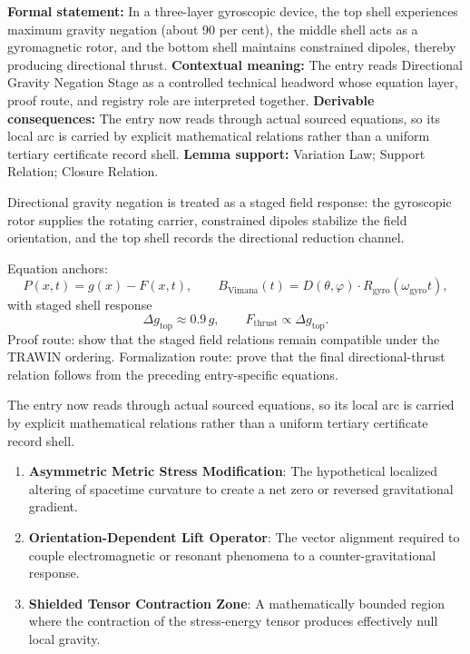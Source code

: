 \begingroup\footnotesize\setlength{\emergencystretch}{3em}\sloppy
\textbf{Formal statement:} In a three-layer gyroscopic device, the top shell experiences maximum gravity negation (about 90 per cent), the middle shell acts as a gyromagnetic rotor, and the bottom shell maintains constrained dipoles, thereby producing directional thrust. \textbf{Contextual meaning:} The entry reads Directional Gravity Negation Stage as a controlled technical headword whose equation layer, proof route, and registry role are interpreted together. \textbf{Derivable consequences:} The entry now reads through actual sourced equations, so its local arc is carried by explicit mathematical relations rather than a uniform tertiary certificate record shell. \textbf{Lemma support:} Variation Law; Support Relation; Closure Relation.\par
\endgroup

Directional gravity negation is treated as a staged field response: the gyroscopic rotor supplies the rotating carrier, constrained dipoles stabilize the field orientation, and the top shell records the directional reduction channel.

Equation anchors:
\[
P(x,t)=g(x)-F(x,t),
\qquad
B_{\mathrm{Vimana}}(t)=D(\theta,\varphi)\cdot R_{\mathrm{gyro}}(\omega_{\mathrm{gyro}}t),
\]
with staged shell response
\[
\Delta g_{\mathrm{top}}\approx0.9\,g,\qquad
F_{\mathrm{thrust}}\propto \Delta g_{\mathrm{top}}.
\]
Proof route: show that the staged field relations remain compatible under the TRAWIN ordering. Formalization route: prove that the final directional-thrust relation follows from the preceding entry-specific equations.

The entry now reads through actual sourced equations, so its local arc is carried by explicit mathematical relations rather than a uniform tertiary certificate record shell.
\endgroup

\begin{enumerate}[leftmargin=1.6em,itemsep=6pt,topsep=4pt]
\item \textbf{Asymmetric Metric Stress Modification}: The hypothetical localized altering of spacetime curvature to create a net zero or reversed gravitational gradient.
\item \textbf{Orientation-Dependent Lift Operator}: The vector alignment required to couple electromagnetic or resonant phenomena to a counter-gravitational response.
\item \textbf{Shielded Tensor Contraction Zone}: A mathematically bounded region where the contraction of the stress-energy tensor produces effectively null local gravity.
\end{enumerate}

